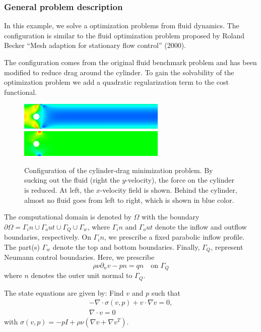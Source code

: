 \subsubsection{General problem description}
In this example, we solve a optimization problems from 
fluid dynamics. The configuration is similar to 
the fluid optimization problem proposed by Roland Becker 
``Mesh adaption for stationary flow control'' (2000).

The configuration
    comes from the original fluid benchmark problem
    and has been modified to reduce drag around the
    cylinder. To gain the solvability of
    the optimization problem we add a quadratic
    regularization term to the cost functional.


\begin{figure}[h]
\centering
    {\includegraphics[width=7cm]{Documentation/visit_Nov_15_2013_0000_a.png}}
    {\includegraphics[width=7cm]{Documentation/visit_Nov_15_2013_0001_a.png}}
  \caption{Configuration of the cylinder-drag minimization problem. 
By sucking out the fluid (right the $y$-velocity), 
the force on the cylinder is reduced. At left, the $x$-velocity field 
is shown. Behind the cylinder, almost no fluid goes from left to right, 
which is shown in blue color.}
\end{figure}

The computational domain is denoted by $\Omega$ with the 
boundary $\partial\Omega
= \Gamma_in \cup \Gamma_out \cup \Gamma_Q \cup \Gamma_w$, 
where $\Gamma_in$ and $\Gamma_out$ denote the inflow and outflow
boundaries, respectively. On $\Gamma_in$, we prescribe a fixed parabolic 
inflow profile. The part(s) $\Gamma_w$ denote the top and bottom 
boundaries. Finally, $\Gamma_Q$, represent Neumann control boundaries. Here,
we prescribe 
\[
\rho\nu \partial_n v - pn = qn \quad\text{on } \Gamma_Q
\] 
where $n$ denotes the outer unit normal to $\Gamma_Q$. 

The state equations are given by: Find $v$ and $p$ such that
\begin{align*}
- \nabla\cdot \sigma(v,p) + v\cdot \nabla v = 0,\\
\nabla\cdot v = 0
\end{align*}
with $\sigma(v,p) = -pI + \rho\nu(\nabla v + \nabla v^T)$.

